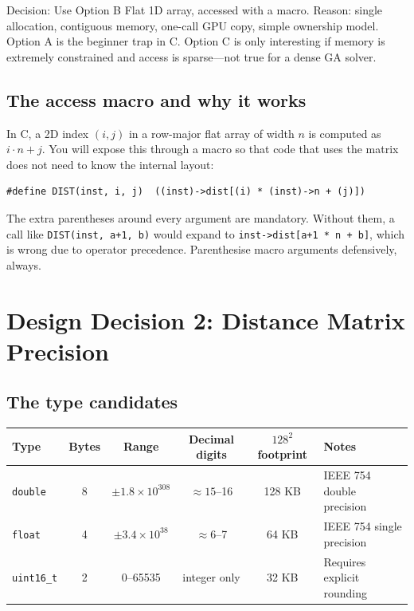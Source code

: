 \begin{goodbox}{Decision: Use Option B}
Flat 1D array, accessed with a macro. Reason: single allocation, contiguous memory, one-call GPU copy, simple ownership model. Option A is the beginner trap in C. Option C is only interesting if memory is extremely constrained and access is sparse---not true for a dense GA solver.
\end{goodbox}

\subsection{The access macro and why it works}

In C, a 2D index $(i, j)$ in a row-major flat array of width $n$ is computed as $i \cdot n + j$. You will expose this through a macro so that code that uses the matrix does not need to know the internal layout:

\begin{lstlisting}[style=cstyle]
#define DIST(inst, i, j)  ((inst)->dist[(i) * (inst)->n + (j)])
\end{lstlisting}

The extra parentheses around every argument are mandatory. Without them, a call like \texttt{DIST(inst, a+1, b)} would expand to \texttt{inst->dist[a+1 * n + b]}, which is wrong due to operator precedence. Parenthesise macro arguments defensively, always.

\newpage

\section{Design Decision 2: Distance Matrix Precision}

\subsection{The type candidates}

\begin{center}
\renewcommand{\arraystretch}{1.5}
\begin{tabular}{lccccl}
\toprule
Type & Bytes & Range & Decimal digits & $128^2$ footprint & Notes \\
\midrule
\texttt{double} & 8 & $\pm 1.8 \times 10^{308}$ & $\approx 15$--16 & 128 KB & IEEE 754 double precision \\
\texttt{float}  & 4 & $\pm 3.4 \times 10^{38}$  & $\approx 6$--7  &  64 KB & IEEE 754 single precision \\
\texttt{uint16\_t} & 2 & 0--65535 & integer only & 32 KB & Requires explicit rounding \\
\bottomrule
\end{tabular}
\end{center}

